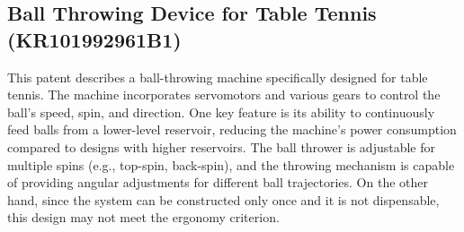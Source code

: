 \documentclass[12pt]{report}
\begin{document}
\subsection{Ball Throwing Device for Table Tennis (KR101992961B1) \cite{Kang2019}}

\begin{minipage}{0.6\textwidth}  %
    This patent describes a ball-throwing machine specifically designed for table tennis. The machine incorporates servomotors and various gears to control the ball's speed, spin, and direction. One key feature is its ability to continuously feed balls from a lower-level reservoir, reducing the machine's power consumption compared to designs with higher reservoirs. The ball thrower is adjustable for multiple spins (e.g., top-spin, back-spin), and the throwing mechanism is capable of providing angular adjustments for different ball trajectories. On the other hand, since the system can be constructed only once and it is not dispensable, this design may not meet the ergonomy criterion. 
\end{minipage}%
\hfill
\end{document}
